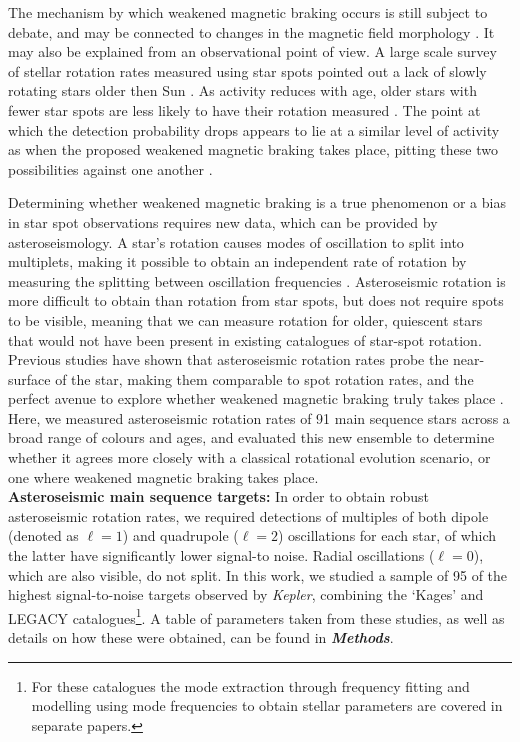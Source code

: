 \documentclass[12pt]{article}
\begin{document}
The mechanism by which weakened magnetic braking occurs is  still subject to debate, and may be connected to changes in the magnetic field morphology \cite{reville+2015,garraffo+2016, metcalfe+2019, see+2019}. It may also be explained from an observational point of view. A large scale survey of stellar rotation rates measured using star spots pointed out a lack of slowly rotating stars older then Sun \cite{mcquillan+2014}. As activity reduces with age, older stars with fewer star spots are less likely to have their rotation measured \cite{matt+2015}. The point at which the detection probability drops appears to lie at a similar level of activity as when the proposed weakened magnetic braking takes place, pitting these two possibilities against one another \cite{vansaders+2019}.

Determining whether weakened magnetic braking is a true phenomenon or a bias in star spot observations requires new data, which can be provided by asteroseismology. A star's rotation causes modes of oscillation to split into multiplets, making it possible to obtain an independent rate of rotation by measuring the splitting between oscillation frequencies \cite{ledoux1951}. Asteroseismic rotation is more difficult to obtain than rotation from star spots, but does not require  spots to be visible, meaning that we can measure rotation for older, quiescent stars that would not have been present in existing catalogues of star-spot rotation. Previous studies have shown that asteroseismic rotation rates probe the near-surface of the star, making them comparable to spot rotation rates, and the perfect avenue to explore whether weakened magnetic braking truly takes place \cite{lund+2014, benomar+2015}. Here, we measured asteroseismic rotation rates of 91 main sequence stars across a broad range of colours and ages, and evaluated this new ensemble to determine whether it agrees more closely with a classical rotational evolution scenario, or one where weakened magnetic braking takes place.\\

\textbf{Asteroseismic main sequence targets:} In order to obtain robust asteroseismic rotation rates, we required detections of multiples of both dipole (denoted as $\ell = 1$) and quadrupole ($\ell = 2$) oscillations for each star, of which the latter have significantly lower signal-to noise. Radial oscillations ($\ell = 0$), which are also visible, do not split. In this work, we studied a sample of 95 of the highest signal-to-noise targets observed by \textit{Kepler}, combining the `Kages' \cite{silvaaguirre+2015,davies+2016} and LEGACY \cite{lund+2017, silvaaguirre+2017} catalogues\footnote{For these catalogues the mode extraction through frequency fitting \cite{davies+2016, lund+2017} and modelling using mode frequencies to obtain stellar parameters \cite{silvaaguirre+2015, silvaaguirre+2017} are covered in separate papers.}. A table of parameters taken from these studies, as well as details on how these were obtained, can be found in \textbf{\textit{Methods}}. 
\end{document}
